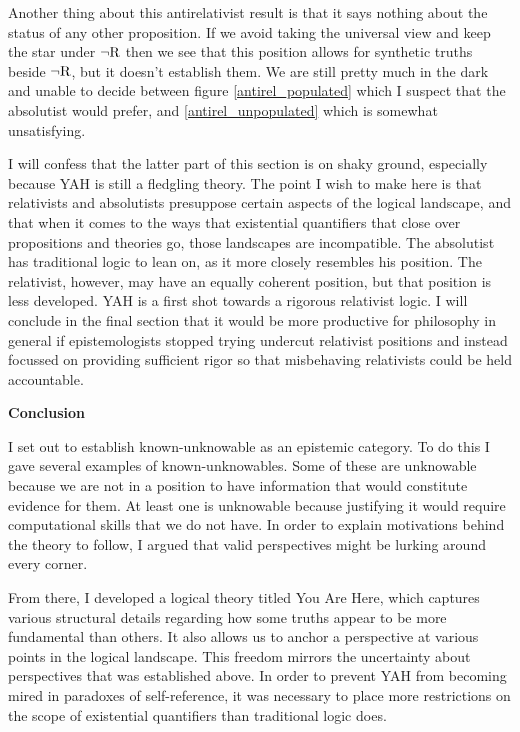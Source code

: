 \documentclass[12pt]{article}
\begin{document}
\begin{flushleft}
Another thing about this antirelativist result is that it says nothing about the status of any other proposition.
If we avoid taking the universal view and keep the star under $\neg \textnormal{R}$ then we see that this position allows for synthetic truths beside $\neg \textnormal{R}$, but it doesn't establish them.
We are still pretty much in the dark and unable to decide between figure \ref{antirel_populated} which I suspect that the absolutist would prefer, and \ref{antirel_unpopulated} which is somewhat unsatisfying.

I will confess that the latter part of this section is on shaky ground, especially because YAH is still a fledgling theory.
The point I wish to make here is that relativists and absolutists presuppose certain aspects of the logical landscape, and that when it comes to the ways that existential quantifiers that close over propositions and theories go, those landscapes are incompatible.
The absolutist has traditional logic to lean on, as it more closely resembles his position.
The relativist, however, may have an equally coherent position, but that position is less developed.
YAH is a first shot towards a rigorous relativist logic.
I will conclude in the final section that it would be more productive for philosophy in general if epistemologists stopped trying undercut relativist positions and instead focussed on providing sufficient rigor so that misbehaving relativists could be held accountable.

\setlength{\parindent}{0in}
\par\bigskip
\textbf{Conclusion}
\setlength{\parindent}{0.5in}

I set out to establish known-unknowable as an epistemic category.
To do this I gave several examples of known-unknowables.
Some of these are unknowable because we are not in a position to have information that would constitute evidence for them.
At least one is unknowable because justifying it would require computational skills that we do not have.
In order to explain motivations behind the theory to follow, I argued that valid perspectives might be lurking around every corner.

From there, I developed a logical theory titled You Are Here, which captures various structural details regarding how some truths appear to be more fundamental than others.
It also allows us to anchor a perspective at various points in the logical landscape.
This freedom mirrors the uncertainty about perspectives that was established above.
In order to prevent YAH from becoming mired in paradoxes of self-reference, it was necessary to place more restrictions on the scope of existential quantifiers than traditional logic does.


\end{flushleft}
\end{document}

